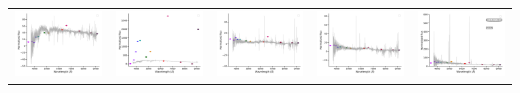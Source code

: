 \begin{center}
\begin{longtable}{l l l l l }
    \includegraphics[width=0.19\linewidth, clip]{Figs/Figs-lamost/spec-56632-EG012606S021203F05_sp16-150-STRIPE82-0031-049213.pdf} & \includegraphics[width=0.19\linewidth, clip]{Figs/Figs-lamost/spec-56654-HD120800N003716B01_sp02-154-SPLUS-n02s22-039680.pdf} & \includegraphics[width=0.19\linewidth, clip]{Figs/Figs-lamost/spec-56656-HD120800N003716M01_sp04-046-SPLUS-n02n24-020916.pdf} & \includegraphics[width=0.19\linewidth, clip]{Figs/Figs-lamost/spec-56656-HD120800N003716M01_sp14-201-SPLUS-n02n23-022190.pdf} & \includegraphics[width=0.19\linewidth, clip]{Figs/Figs-lamost/spec-56741-HD115451S012705B_sp01-058-SPLUS-n03s21-009182.pdf} \\

\end{longtable}
\end{center}
